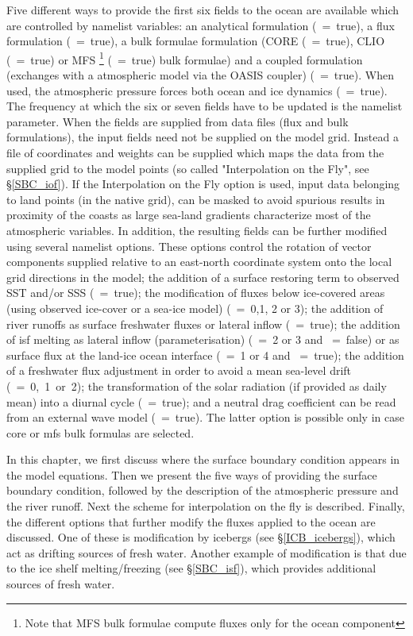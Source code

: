 Five different ways to provide the first six fields to the ocean are available which 
are controlled by namelist  variables: an analytical formulation (~=~true), 
a flux formulation (~=~true), a bulk formulae formulation (CORE 
(~=~true), CLIO (~=~true) or MFS
\footnote { Note that MFS bulk formulae compute fluxes only for the ocean component}
(~=~true) bulk formulae) and a coupled 
formulation (exchanges with a atmospheric model via the OASIS coupler) 
(~=~true). When used, the atmospheric pressure forces both 
ocean and ice dynamics (~=~true).
The frequency at which the six or seven fields have to be updated is the  
namelist parameter. 
When the fields are supplied from data files (flux and bulk formulations), the input fields 
need not be supplied on the model grid.  Instead a file of coordinates and weights can 
be supplied which maps the data from the supplied grid to the model points 
(so called "Interpolation on the Fly", see \S\ref{SBC_iof}).
If the Interpolation on the Fly option is used, input data belonging to land points (in the native grid),
can be masked to avoid spurious results in proximity of the coasts  as large sea-land gradients characterize
most of the atmospheric variables.
In addition, the resulting fields can be further modified using several namelist options. 
These options control  the rotation of vector components supplied relative to an east-north 
coordinate system onto the local grid directions in the model; the addition of a surface 
restoring term to observed SST and/or SSS (~=~true); the modification of fluxes 
below ice-covered areas (using observed ice-cover or a sea-ice model) 
(~=~0,1, 2 or 3); the addition of river runoffs as surface freshwater 
fluxes or lateral inflow (~=~true); the addition of isf melting as lateral inflow (parameterisation) 
(~=~2 or 3 and ~=~false) or as surface flux at the land-ice ocean interface
(~=~1 or 4 and ~=~true); 
the addition of a freshwater flux adjustment in order to avoid a mean sea-level drift (~=~0,~1~or~2); the 
transformation of the solar radiation (if provided as daily mean) into a diurnal 
cycle (~=~true); and a neutral drag coefficient can be read from an external wave 
model (~=~true). The latter option is possible only in case core or mfs bulk formulas are selected.

In this chapter, we first discuss where the surface boundary condition appears in the
model equations. Then we present the five ways of providing the surface boundary condition, 
followed by the description of the atmospheric pressure and the river runoff. 
Next the scheme for interpolation on the fly is described.
Finally, the different options that further modify the fluxes applied to the ocean are discussed.
One of these is modification by icebergs (see \S\ref{ICB_icebergs}), which act as drifting sources of fresh water.
Another example of modification is that due to the ice shelf melting/freezing (see \S\ref{SBC_isf}), 
which provides additional sources of fresh water.


